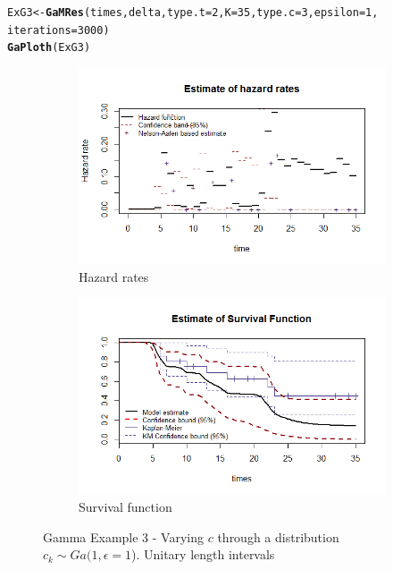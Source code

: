 \documentclass[letterpaper]{article}\usepackage[]{graphicx}\usepackage[]{color}
\makeatletter
\newcommand{\hlnum}[1]{\textcolor[rgb]{0.686,0.059,0.569}{#1}}%
\newcommand{\hlstd}[1]{\textcolor[rgb]{0.345,0.345,0.345}{#1}}%
\newcommand{\hlkwb}[1]{\textcolor[rgb]{0.69,0.353,0.396}{#1}}%
\newcommand{\hlkwc}[1]{\textcolor[rgb]{0.333,0.667,0.333}{#1}}%
\newcommand{\hlkwd}[1]{\textcolor[rgb]{0.737,0.353,0.396}{\textbf{#1}}}%
\newenvironment{kframe}{%
 \def\at@end@of@kframe{}%
 \ifinner\ifhmode%
  \def\at@end@of@kframe{\end{minipage}}%
  \begin{minipage}{\columnwidth}%
 \fi\fi%
 \def\FrameCommand##1{\hskip\@totalleftmargin \hskip-\fboxsep
 \colorbox{shadecolor}{##1}\hskip-\fboxsep
     \hskip-\linewidth \hskip-\@totalleftmargin \hskip\columnwidth}%
 \MakeFramed {\advance\hsize-\width
   \@totalleftmargin\z@ \linewidth\hsize
   \@setminipage}}%
 {\par\unskip\endMakeFramed%
 \at@end@of@kframe}
\newenvironment{knitrout}{}{} %
\makeatother
\begin{document}
\begin{knitrout}
\color{fgcolor}\begin{kframe}
\begin{alltt}
\hlstd{ExG3} \hlkwb{<-} \hlkwd{GaMRes}\hlstd{(times, delta,} \hlkwc{type.t} \hlstd{=} \hlnum{2}\hlstd{,} \hlkwc{K} \hlstd{=} \hlnum{35}\hlstd{,} \hlkwc{type.c} \hlstd{=} \hlnum{3}\hlstd{,} \hlkwc{epsilon} \hlstd{=} \hlnum{1}\hlstd{,}
               \hlkwc{iterations} \hlstd{=} \hlnum{3000}\hlstd{)}
\hlkwd{GaPloth}\hlstd{(ExG3)}
\end{alltt}
\end{kframe}
\end{knitrout}

\begin{figure}
  \centering
  \begin{subfigure}[a]{\textwidth}\centering
    \includegraphics[width=\textwidth]{G31.png}
    \caption{Hazard rates}
  \end{subfigure}
  \begin{subfigure}[b]{\textwidth}\centering
    \includegraphics[width=\textwidth]{G32.png}
    \caption{Survival function}
  \end{subfigure}
  \caption{Gamma Example 3 - Varying $c$ through a distribution $c_k\sim Ga(1,\epsilon = 1$). Unitary length intervals}
  \label{fig:G3}
\end{figure}
\end{document}

